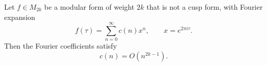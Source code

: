 Let $f \in M_{2k}$ be a modular form of weight $2k$ that is not a cusp form, with Fourier expansion
$$
f(\tau) = \sum_{n=0}^{\infty} c(n) x^n, \qquad x = e^{2\pi i \tau}.
$$
Then the Fourier coefficients satisfy
$$
c(n) = O(n^{2k-1}).
$$
